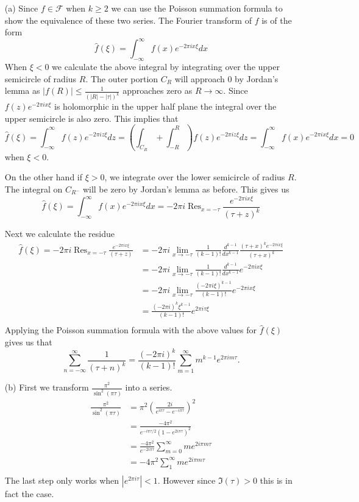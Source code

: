 \documentclass[10pt]{article}
\DeclareMathOperator{\res}{Res}
\theoremstyle{plain}
\theoremstyle{remark}
\begin{document}
\begin{enumerate}
\item[(a)] Since $f\in\mathcal{F}$ when $k\geq 2$ we can use the Poisson
  summation formula to show the equivalence of these two series. The
  Fourier transform of $f$ is of the form
  \[
    \hat{f}(\xi)=\int_{-\infty}^\infty f(x)e^{-2\pi ix\xi}dx
  \]
  When $\xi<0$ we calculate the above integral by integrating over
  the upper semicircle of radius $R$. The outer portion $C_R$ will
  approach $0$ by Jordan's lemma as $|f(R)|\leq\frac{1}{(|R|-|\tau|)^k}$ approaches
  zero as $R\rightarrow\infty$. Since $f(z)e^{-2\pi i x\xi}$ is holomorphic in the upper half plane
  the integral over the upper semicircle is also zero. This implies that
  \[
    \hat{f}(\xi)=\int_{-\infty}^\infty f(z)e^{-2\pi iz\xi}dz = (\int_{C_R}+\int_{-R}^R)f(z)e^{-2\pi iz\xi}dz = \int_{-\infty}^\infty f(x)e^{-2\pi ix\xi} dx = 0
  \]
  when $\xi<0$.

  On the other hand if $\xi>0$, we integrate over the lower semicircle of radius
  $R$. The integral on $C_{R^-}$ will be zero by Jordan's lemma as before. This
  gives us
  \[
    \hat{f}(\xi)=\int_{-\infty}^\infty f(x)e^{-2\pi i x\xi}dx = -2\pi i\res_{x=-\tau}\frac{e^{-2\pi i x\xi}}{(\tau+z)^k}
  \]

  Next we calculate the residue
  \begin{align*}
    \hat{f}(\xi)=-2\pi i \res_{x=-\tau}\frac{e^{-2\pi i x\xi}}{(\tau+z)} &=-2\pi i\lim_{x\rightarrow-\tau}\frac{1}{(k-1)!}\frac{d^{k-1}}{dx^{k-1}}\frac{(\tau+x)^k e^{-2\pi i x\xi}}{(\tau+x)^k}\\
                                                          &=-2\pi i\lim_{x\rightarrow-\tau}\frac{1}{(k-1)!}\frac{d^{k-1}}{dx^{k-1}}e^{-2\pi i x\xi}\\
                                                          &=-2\pi i\lim_{x\rightarrow-\tau} \frac{(-2\pi i\xi)^{k-1}}{(k-1)!}e^{-2\pi i x\xi}\\
                                                          &=\frac{(-2\pi i)^{k}\xi^{k-1}}{(k-1)!}e^{2\pi i \tau\xi}\\
  \end{align*}
  Applying the Poisson summation formula with the above values for $\hat{f}(\xi)$
  gives us that
  \[
    \sum_{n = -\infty}^\infty\frac{1}{(\tau +n)^k} = \frac{(-2\pi i )^k}{(k-1)!} \sum_{m=1}^{\infty} m^{k-1}e^{2\pi im\tau}.
  \]
\item[(b)] First we transform $\frac{\pi^2}{\sin^2(\pi\tau)}$ into a series.
  \begin{align*}
    \frac{\pi^2}{\sin^2(\pi\tau)} &= \pi^2\left(\frac{2i}{e^{i\pi\tau}-e^{-i\pi\tau}}\right)^2\\
                               &=\frac{-4\pi^2}{e^{-i\pi\tau/2}(1-e^{2i\pi\tau})^2}\\
                               &=\frac{-4\pi^2}{e^{-2i\pi\tau}}\sum_{m=0}^\infty me^{2i\pi m\tau}\\
                               &=-4\pi^2\sum_{1}^\infty me^{2i\pi m\tau}\\
  \end{align*}
  The last step only works when $|e^{2\pi i\tau}|<1$. However since $\Im(\tau)>0$
  this is in fact the case.


\end{enumerate}
\end{document}
